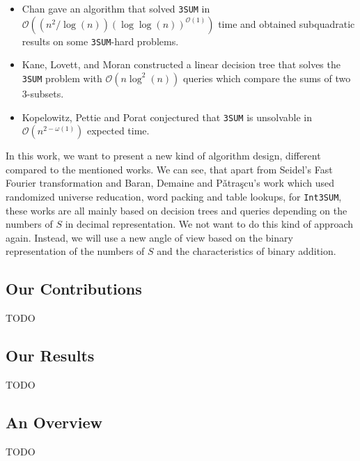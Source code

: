 \begin{itemize}
    \item Chan \cite{chan2019more} gave an algorithm that solved \texttt{3SUM} in $\mathcal{O}\left(\left(n^{2}/\log\left(n\right)\right)\left(\log \log\left(n\right)\right)^{\mathcal{O}\left(1\right)}\right)$ time and obtained subquadratic results on some \texttt{3SUM}-hard problems.
    \item Kane, Lovett, and Moran \cite{kane2017nearoptimal} constructed a linear decision tree that solves the \texttt{3SUM} problem with $\mathcal{O}\left(n \log^{2}\left(n\right)\right)$ queries which compare the sums of two $3$-subsets.
    \item Kopelowitz, Pettie and Porat \cite{kopelowitz2014higher} conjectured that \texttt{3SUM} is unsolvable in $\mathcal{O}\left(n^{2 - \omega\left(1\right)}\right)$ expected time.
\label{it:realtedwork}
\end{itemize}

In this work, we want to present a new kind of algorithm design, different compared to the mentioned works. We can see, that apart from Seidel's  \cite{edelsbrunner1986constructing} Fast Fourier transformation and Baran, Demaine and Pǎtra{\c{s}}cu's \cite{baran2005subquadratic} work which used randomized universe reducation, word packing and table lookups, for \texttt{Int3SUM}, these works are all mainly based on decision trees and queries depending on the numbers of $S$ in decimal representation. We not want to do this kind of approach again. Instead, we will use a new angle of view based on the binary representation of the numbers of $S$ and the characteristics of binary addition.
\subsection{Our Contributions}
\label{ss:ourcontributions}
TODO
\subsection{Our Results}
\label{ss:ourresults}
TODO
\subsection{An Overview}
\label{ss:anoverview}
TODO
